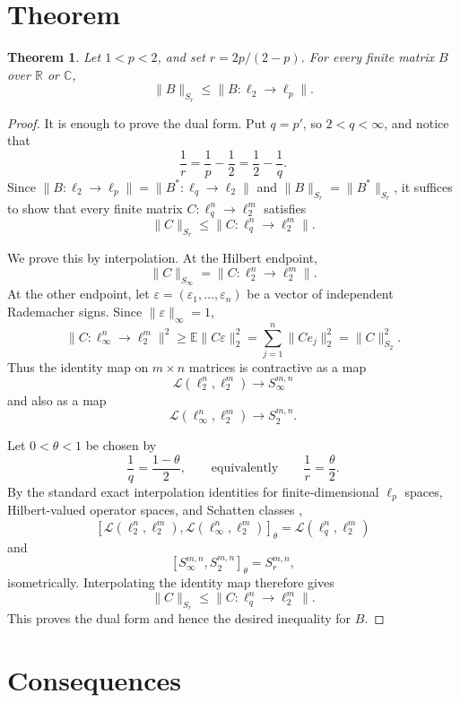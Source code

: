 \documentclass[11pt]{article}
\newtheorem*{theorem}{Theorem}
\begin{document}
\section*{Theorem}

\begin{theorem}
Let \(1<p<2\), and set \(r=2p/(2-p)\). For every finite matrix \(B\) over
\(\mathbb R\) or \(\mathbb C\),
\[
        \|B\|_{S_r}\le \|B:\ell_2\to \ell_p\|.
\]
\end{theorem}

\begin{proof}
It is enough to prove the dual form. Put \(q=p'\), so \(2<q<\infty\), and
notice that
\[
        \frac1r=\frac1p-\frac12=\frac12-\frac1q .
\]
Since \(\|B:\ell_2\to\ell_p\|=\|B^*:\ell_q\to\ell_2\|\) and
\(\|B\|_{S_r}=\|B^*\|_{S_r}\), it suffices to show that every finite matrix
\(C:\ell_q^n\to\ell_2^m\) satisfies
\[
        \|C\|_{S_r}\le \|C:\ell_q^n\to\ell_2^m\|.
\]

We prove this by interpolation. At the Hilbert endpoint,
\[
        \|C\|_{S_\infty}=\|C:\ell_2^n\to\ell_2^m\|.
\]
At the other endpoint, let \(\varepsilon=(\varepsilon_1,\ldots,\varepsilon_n)\)
be a vector of independent Rademacher signs. Since \(\|\varepsilon\|_\infty=1\),
\[
 \|C:\ell_\infty^n\to\ell_2^m\|^2
      \ge \mathbb E\|C\varepsilon\|_2^2
      = \sum_{j=1}^n \|Ce_j\|_2^2
      = \|C\|_{S_2}^2.
\]
Thus the identity map on \(m\times n\) matrices is contractive as a map
\[
 \mathcal L(\ell_2^n,\ell_2^m)\longrightarrow S_\infty^{m,n}
\]
and also as a map
\[
 \mathcal L(\ell_\infty^n,\ell_2^m)\longrightarrow S_2^{m,n}.
\]

Let \(0<\theta<1\) be chosen by
\[
        \frac1q=\frac{1-\theta}{2},
        \qquad\text{equivalently}\qquad
        \frac1r=\frac{\theta}{2}.
\]
By the standard exact interpolation identities for finite-dimensional
\(\ell_p\) spaces, Hilbert-valued operator spaces, and Schatten classes
\cite{BL,Simon},
\[
 [\mathcal L(\ell_2^n,\ell_2^m),
   \mathcal L(\ell_\infty^n,\ell_2^m)]_\theta
      =\mathcal L(\ell_q^n,\ell_2^m)
\]
and
\[
        [S_\infty^{m,n},S_2^{m,n}]_\theta=S_r^{m,n},
\]
isometrically. Interpolating the identity map therefore gives
\[
        \|C\|_{S_r}\le \|C:\ell_q^n\to\ell_2^m\|.
\]
This proves the dual form and hence the desired inequality for \(B\).
\end{proof}

\section*{Consequences}
\end{document}
